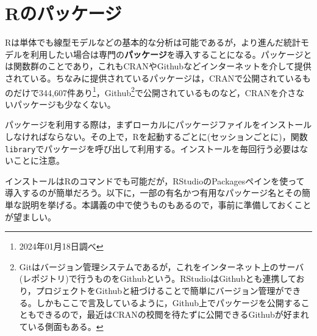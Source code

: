 \documentclass[
  a4paper,
]{ltjsbook}
\begin{document}
\section{Rのパッケージ}\label{rux306eux30d1ux30c3ux30b1ux30fcux30b8}

Rは単体でも線型モデルなどの基本的な分析は可能であるが，より進んだ統計モデルを利用したい場合は専門の\textbf{パッケージ}を導入することになる。パッケージとは関数群のことであり，これもCRANやGithubなどインターネットを介して提供されている。ちなみに提供されているパッケージは，CRANで公開されているものだけで344,607件あり\footnote{2024年01月18日調べ}，Github\footnote{Gitはバージョン管理システムであるが，これをインターネット上のサーバ(レポジトリ)で行うものをGithubという。RStudioはGithubとも連携しており，プロジェクトをGithubと紐づけることで簡単にバージョン管理ができる。しかもここで言及しているように，Github上でパッケージを公開することもできるので，最近はCRANの校閲を待たずに公開できるGithubが好まれている側面もある。}で公開されているものなど，CRANを介さないパッケージも少なくない。

パッケージを利用する際は，まずローカルにパッケージファイルをインストールしなければならない。その上で，Rを起動するごとに(セッションごとに)，関数\texttt{library}でパッケージを呼び出して利用する。インストールを毎回行う必要はないことに注意。

インストールはRのコマンドでも可能だが，RStudioのPackagesペインを使って導入するのが簡単だろう。以下に，一部の有名かつ有用なパッケージ名とその簡単な説明を挙げる。本講義の中で使うものもあるので，事前に準備しておくことが望ましい。
\end{document}
